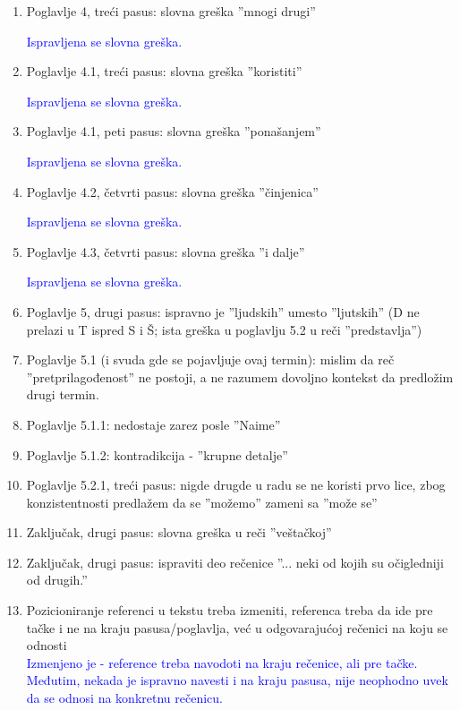 \documentclass[a4paper]{report}
\newcommand{\odgovor}[1]{\textcolor{blue}{#1}}
\begin{document}
\begin{enumerate}
\item Poglavlje 4, treći pasus: slovna greška ''mnogi drugi''

\odgovor{Ispravljena se slovna greška.}

\item Poglavlje 4.1, treći pasus: slovna greška ''koristiti''

\odgovor{Ispravljena se slovna greška.}

\item Poglavlje 4.1, peti pasus: slovna greška ''ponašanjem''

\odgovor{Ispravljena se slovna greška.}

\item Poglavlje 4.2, četvrti pasus: slovna greška ''činjenica''

\odgovor{Ispravljena se slovna greška.}

\item Poglavlje 4.3, četvrti pasus: slovna greška ''i dalje''

\odgovor{Ispravljena se slovna greška.}

\item Poglavlje 5, drugi pasus: ispravno je ''ljudskih'' umesto ''ljutskih'' (D ne prelazi u T ispred S i Š; ista greška u poglavlju 5.2 u reči ''predstavlja'')

\item Poglavlje 5.1 (i svuda gde se pojavljuje ovaj termin): mislim da reč ''pretprilagođenost'' ne postoji, a ne razumem dovoljno kontekst da predložim drugi termin.

\item Poglavlje 5.1.1: nedostaje zarez posle ''Naime''

\item Poglavlje 5.1.2: kontradikcija - ''krupne detalje''

\item Poglavlje 5.2.1, treći pasus: nigde drugde u radu se ne koristi prvo lice, zbog konzistentnosti predlažem da se ''možemo'' zameni sa ''može se''

\item Zaključak, drugi pasus: slovna greška u reči ''veštačkoj''

\item Zaključak, drugi pasus: ispraviti deo rečenice ''... neki od kojih su očigledniji od drugih.''

\item Pozicioniranje referenci u tekstu treba izmeniti, referenca treba da ide pre tačke i ne na kraju pasusa/poglavlja, već u odgovarajućoj rečenici na koju se odnosti \\
\odgovor{Izmenjeno je - reference treba navodoti na kraju rečenice, ali pre tačke. Međutim, nekada je ispravno navesti i na kraju pasusa, nije neophodno uvek da se odnosi na konkretnu rečenicu.}


\end{enumerate}
\end{document}
